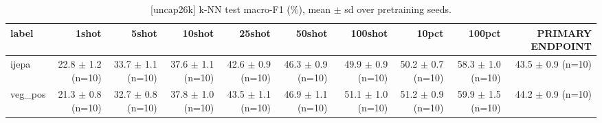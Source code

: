 \begin{table}[t]
\centering
\small
\caption{[uncap26k] k-NN test macro-F1 (\%), mean $\pm$ sd over pretraining seeds.}
\label{tab:main_results_knn}
\begin{tabular}{lrrrrrrrrr}
\toprule
label & 1shot & 5shot & 10shot & 25shot & 50shot & 100shot & 10pct & 100pct & PRIMARY ENDPOINT \\
\midrule
ijepa & 22.8 $\pm$ 1.2 (n=10) & 33.7 $\pm$ 1.1 (n=10) & 37.6 $\pm$ 1.1 (n=10) & 42.6 $\pm$ 0.9 (n=10) & 46.3 $\pm$ 0.9 (n=10) & 49.9 $\pm$ 0.9 (n=10) & 50.2 $\pm$ 0.7 (n=10) & 58.3 $\pm$ 1.0 (n=10) & 43.5 $\pm$ 0.9 (n=10) \\
veg\_pos & 21.3 $\pm$ 0.8 (n=10) & 32.7 $\pm$ 0.8 (n=10) & 37.8 $\pm$ 1.0 (n=10) & 43.5 $\pm$ 1.1 (n=10) & 46.9 $\pm$ 1.1 (n=10) & 51.1 $\pm$ 1.0 (n=10) & 51.2 $\pm$ 0.9 (n=10) & 59.9 $\pm$ 1.5 (n=10) & 44.2 $\pm$ 0.9 (n=10) \\
\bottomrule
\end{tabular}
\end{table}
